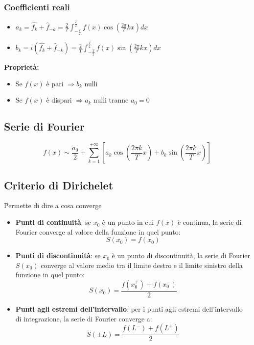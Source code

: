 \documentclass[10pt, a4paper]{article}
\begin{document}
        \subsubsection{Coefficienti reali}
        \begin{itemize}
            \item $a_k=\hat{f_k}+\hat{f}_{-k}=\frac{2}{T}\int_{-\frac{T}{2}}^{\frac{T}{2}}f(x)\cos\left(\frac{2\pi}{T}kx\right)dx$
            \item $b_k=i(\hat{f_k}+\hat{f}_{-k})=\frac{2}{T}\int_{-\frac{T}{2}}^{\frac{T}{2}}f(x)\sin\left(\frac{2\pi}{T}kx\right)dx$
        \end{itemize}
        \textbf{Proprietà:} \begin{itemize}
            \item Se $f(x)$ è pari $\Rightarrow b_k$ nulli
            \item Se $f(x)$ è dispari $\Rightarrow a_k$ nulli tranne $a_0=0$
        \end{itemize}
    \subsection{Serie di Fourier}
        \begin{equation*}
            f(x)\sim \frac{a_0}{2}+\sum_{k=1}^{+\infty}\left[a_k\cos\left(\frac{2\pi k}{T}x\right)+b_k\sin\left(\frac{2\pi k}{T}x\right)\right]
        \end{equation*}
    \subsection{Criterio di Dirichelet}
        Permette di dire a cosa converge
        \begin{itemize}
            \item \textbf{Punti di continuità}: se $x_0$ è un punto in cui $f(x)$ è continua, la serie di Fourier converge al valore della funzione in quel punto: \begin{equation*}
                S(x_0)=f(x_0)
            \end{equation*}
            \item \textbf{Punti di discontinuità}: se $x_0$ è un punto di discontinuità, la serie di Fourier $S(x_0)$ converge al valore medio tra il limite destro e il limite sinistro della funzione in quel punto: \begin{equation*}
                S(x_0)=\frac{f(x_0^+)+f(x_0^-)}{2}
            \end{equation*}
            \item \textbf{Punti agli estremi dell'intervallo}: per i punti agli estremi dell'intervallo di integrazione, la serie di Fourier converge a: \begin{equation*}
                S(\pm L)=\frac{f(L^-)+f(L^+)}{2}
            \end{equation*}
        \end{itemize}
\end{document}
